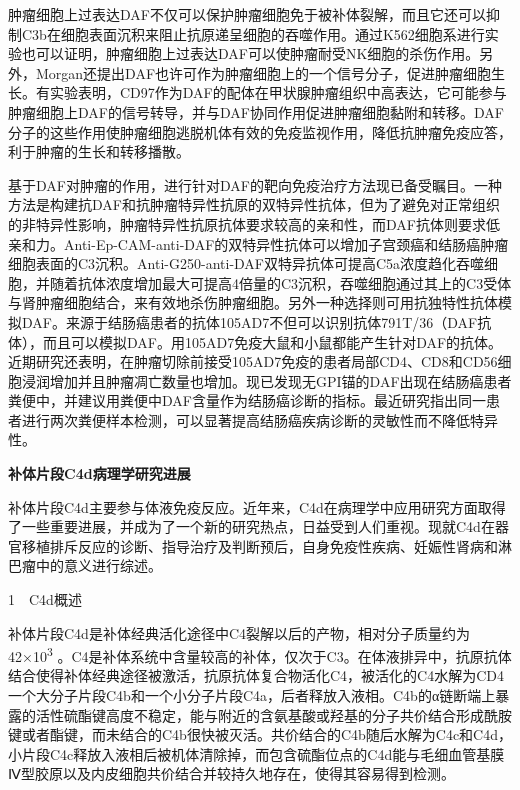 肿瘤细胞上过表达DAF不仅可以保护肿瘤细胞免于被补体裂解，而且它还可以抑制C3b在细胞表面沉积来阻止抗原递呈细胞的吞噬作用。通过K562细胞系进行实验也可以证明，肿瘤细胞上过表达DAF可以使肿瘤耐受NK细胞的杀伤作用。另外，Morgan还提出DAF也许可作为肿瘤细胞上的一个信号分子，促进肿瘤细胞生长。有实验表明，CD97作为DAF的配体在甲状腺肿瘤组织中高表达，它可能参与肿瘤细胞上DAF的信号转导，并与DAF协同作用促进肿瘤细胞黏附和转移。DAF分子的这些作用使肿瘤细胞逃脱机体有效的免疫监视作用，降低抗肿瘤免疫应答，利于肿瘤的生长和转移播散。

基于DAF对肿瘤的作用，进行针对DAF的靶向免疫治疗方法现已备受瞩目。一种方法是构建抗DAF和抗肿瘤特异性抗原的双特异性抗体，但为了避免对正常组织的非特异性影响，肿瘤特异性抗原抗体要求较高的亲和性，而DAF抗体则要求低亲和力。Anti-Ep-CAM-anti-DAF的双特异性抗体可以增加子宫颈癌和结肠癌肿瘤细胞表面的C3沉积。Anti-G250-anti-DAF双特异抗体可提高C5a浓度趋化吞噬细胞，并随着抗体浓度增加最大可提高4倍量的C3沉积，吞噬细胞通过其上的C3受体与肾肿瘤细胞结合，来有效地杀伤肿瘤细胞。另外一种选择则可用抗独特性抗体模拟DAF。来源于结肠癌患者的抗体105AD7不但可以识别抗体791T/36（DAF抗体），而且可以模拟DAF。用105AD7免疫大鼠和小鼠都能产生针对DAF的抗体。近期研究还表明，在肿瘤切除前接受105AD7免疫的患者局部CD4、CD8和CD56细胞浸润增加并且肿瘤凋亡数量也增加。现已发现无GPI锚的DAF出现在结肠癌患者粪便中，并建议用粪便中DAF含量作为结肠癌诊断的指标。最近研究指出同一患者进行两次粪便样本检测，可以显著提高结肠癌疾病诊断的灵敏性而不降低特异性。

\begin{center}
  \textbf{\Large 补体片段C4d病理学研究进展}
\end{center}

补体片段C4d主要参与体液免疫反应。近年来，C4d在病理学中应用研究方面取得了一些重要进展，并成为了一个新的研究热点，日益受到人们重视。现就C4d在器官移植排斥反应的诊断、指导治疗及判断预后，自身免疫性疾病、妊娠性肾病和淋巴瘤中的意义进行综述。

1　C4d概述

补体片段C4d是补体经典活化途径中C4裂解以后的产物，相对分子质量约为42×10\textsuperscript{3}
。C4是补体系统中含量较高的补体，仅次于C3。在体液排异中，抗原抗体结合使得补体经典途径被激活，抗原抗体复合物活化C4，被活化的C4水解为CD4一个大分子片段C4b和一个小分子片段C4a，后者释放入液相。C4b的α链断端上暴露的活性硫酯键高度不稳定，能与附近的含氨基酸或羟基的分子共价结合形成酰胺键或者酯键，而未结合的C4b很快被灭活。共价结合的C4b随后水解为C4c和C4d，小片段C4c释放入液相后被机体清除掉，而包含硫酯位点的C4d能与毛细血管基膜Ⅳ型胶原以及内皮细胞共价结合并较持久地存在，使得其容易得到检测。

